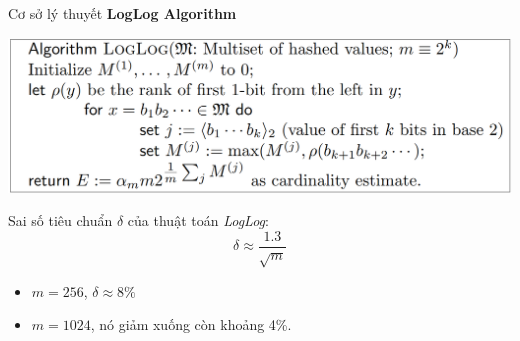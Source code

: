 \documentclass[10pt]{beamer}
\begin{document}
\begin{frame}[fragile]{Cơ sở lý thuyết}
  \textbf{LogLog Algorithm}

  \includegraphics[scale=0.35]{loglog.png}

  \indent Sai số tiêu chuẩn $\delta$ của thuật toán \textit{LogLog}:
\[\delta \approx \frac{1.3}{\sqrt{m}}\]
\begin{itemize}
  \item $m = 256$, $\delta \approx 8\%$
  \item $m = 1024$, nó giảm xuống còn khoảng 4\%.
\end{itemize}

\end{frame}
\end{document}
